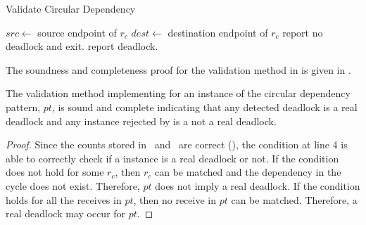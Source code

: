 \begin{algorithm}
\caption{Validate Circular Dependency}\label{algo:vcircular}
\begin{algorithmic}[1]
\State $\mathit{src} \gets$ source endpoint of $\mathit{r_c}$ 
\State $\mathit{dest} \gets$ destination endpoint of $\mathit{r_c}$
\State report no deadlock and exit.
\EndIf
\EndFor
\State report deadlock.
\end{algorithmic}
\end{algorithm}



The soundness and completeness proof for the validation method in  is given in .

\begin{lemma}
The validation method implementing  for an instance of the circular dependency pattern, $\mathit{pt}$, is sound and complete indicating that any detected deadlock is a real deadlock and any instance rejected by  is a not a real deadlock. 
\label{lemma:circular}
\end{lemma}
\begin{proof}
Since the counts stored in \epsnd\ and \eprcv\ are correct (), the condition at line 4 is able to correctly check if a instance is a real deadlock or not. If the condition does not hold for some $r_c$, then $r_c$ can be matched and the dependency in the cycle does not exist. Therefore, $\mathit{pt}$ does not imply a real deadlock. If the condition holds for all the receives in $\mathit{pt}$, then no receive in $\mathit{pt}$ can be matched. Therefore, a real deadlock may occur for $\mathit{pt}$.
\end{proof} 





